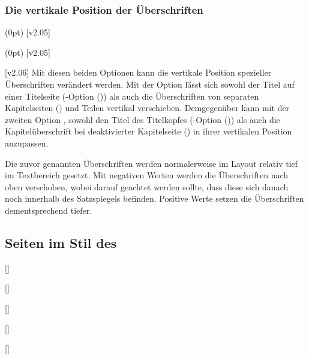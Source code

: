 \begin{DeclareEntity*}{}
\begin{DeclareEntity*}{}
\begin{DeclareEntity*}{}
\subsubsection{Die vertikale Position der Überschriften}

\begin{Declaration}
  {}
  (0pt)
  [v2.05]
\begin{Declaration}
  {}
  (0pt)
  [v2.05]
\printdeclarationlist[Layout!Teileseiten|?},Layout!Kapitelseiten|?]

[v2.06]%
Mit diesen beiden Optionen kann die vertikale Position spezieller Überschriften 
verändert werden. Mit der Option  lässt sich sowohl 
der Titel auf einer Titelseite 
(\KOMAScript-Option ()) als auch 
die Überschriften von separaten Kapitelseiten () und 
Teilen vertikal verschieben. Demgegenüber kann mit der zweiten Option 
, sowohl den Titel des Titelkopfes 
(\KOMAScript-Option ()) als auch 
die Kapitelüberschrift bei deaktivierter Kapitelseite 
() in ihrer vertikalen Position anzupassen.

Die zuvor genannten Überschriften werden normalerweise im Layout relativ tief 
im Textbereich gesetzt. Mit negativen Werten werden die Überschriften nach oben 
verschoben, wobei darauf geachtet werden sollte, dass diese sich danach noch 
innerhalb des Satzspiegels befinden. Positive Werte setzen die Überschriften 
dementsprechend tiefer.%
\end{Declaration}
\end{Declaration}
%



\subsection{%
  Seiten im Stil des \CDs%
  \label{sec:tudheadings}%
}

\begin{Declaration}
  {[]}
\begin{Declaration}
  {[]}
\begin{Declaration}
  {[]}
\begin{Declaration}
  {[]}
\begin{Declaration}
  {[]}


\end{Declaration}
\end{Declaration}
\end{Declaration}
\end{Declaration}
\end{Declaration}
\end{DeclareEntity*}
\end{DeclareEntity*}
\end{DeclareEntity*}
